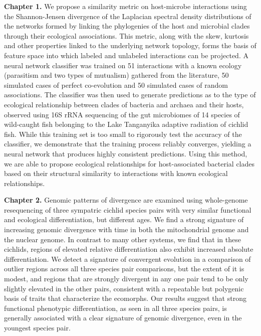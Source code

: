 
\noindent\textbf{Chapter 1.} We propose a similarity metric on host-microbe interactions using the Shannon-Jensen divergence of the Laplacian spectral density distributions of the networks formed by linking the phylogenies of the host and microbial clades through their ecological associations. This metric, along with the skew, kurtosis and other properties linked to the underlying network topology, forms the basis of feature space into which labeled and unlabeled interactions can be projected. A neural network classifier was trained on 51 interactions with a known ecology (parasitism and two types of mutualism) gathered from the literature, 50 simulated cases of perfect co-evolution and 50 simulated cases of random associations. The classifier was then used to generate predictions as to the type of ecological relationship between clades of bacteria and archaea and their hosts, observed using 16S rRNA sequencing of the gut microbiomes of 14 species of wild-caught fish belonging to the Lake Tanganyika adaptive radiation of cichlid fish. While this training set is too small to rigorously test the accuracy of the classifier, we demonstrate that the training process reliably converges, yielding a neural network that produces highly consistent predictions. Using this method, we are able to propose ecological relationships for host-associated bacterial clades based on their structural similarity to interactions with known ecological relationships.


\noindent\textbf{Chapter 2.} Genomic patterns of divergence are examined using whole-genome resequencing of three sympatric cichlid species pairs with very similar functional and ecological differentiation, but different ages. We find a strong signature of increasing genomic divergence with time in both the mitochondrial genome and the nuclear genome. In contrast to many other systems, we find that in these cichlids, regions of elevated relative differentiation also exhibit increased absolute differentiation. We detect a signature of convergent evolution in a comparison of outlier regions across all three species pair comparisons, but the extent of it is modest, and regions that are strongly divergent in any one pair tend to be only slightly elevated in the other pairs, consistent with a repeatable but polygenic basis of traits that characterize the ecomorphs. Our results suggest that strong functional phenotypic differentiation, as seen in all three species pairs, is generally associated with a clear signature of genomic divergence, even in the youngest species pair.

